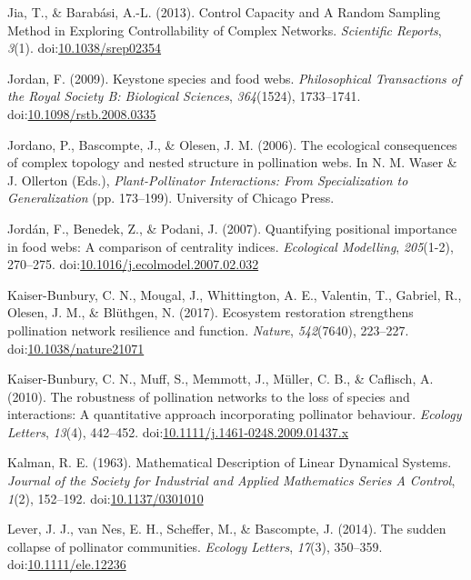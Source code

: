 \documentclass[a4paper]{artikel1}
\theoremstyle{definition}
\theoremstyle{definition}
\theoremstyle{definition}
\theoremstyle{remark}
\begin{document}
\hypertarget{ref-jia_control_2013}{}
Jia, T., \& Barabási, A.-L. (2013). Control Capacity and A Random
Sampling Method in Exploring Controllability of Complex Networks.
\emph{Scientific Reports}, \emph{3}(1).
doi:\href{https://doi.org/10.1038/srep02354}{10.1038/srep02354}

\hypertarget{ref-jordan_keystone_2009}{}
Jordan, F. (2009). Keystone species and food webs. \emph{Philosophical
Transactions of the Royal Society B: Biological Sciences},
\emph{364}(1524), 1733--1741.
doi:\href{https://doi.org/10.1098/rstb.2008.0335}{10.1098/rstb.2008.0335}

\hypertarget{ref-jordano_ecological_2006}{}
Jordano, P., Bascompte, J., \& Olesen, J. M. (2006). The ecological
consequences of complex topology and nested structure in pollination
webs. In N. M. Waser \& J. Ollerton (Eds.), \emph{Plant-Pollinator
Interactions: From Specialization to Generalization} (pp. 173--199).
University of Chicago Press.

\hypertarget{ref-jordan_quantifying_2007}{}
Jordán, F., Benedek, Z., \& Podani, J. (2007). Quantifying positional
importance in food webs: A comparison of centrality indices.
\emph{Ecological Modelling}, \emph{205}(1-2), 270--275.
doi:\href{https://doi.org/10.1016/j.ecolmodel.2007.02.032}{10.1016/j.ecolmodel.2007.02.032}

\hypertarget{ref-kaiser-bunbury_ecosystem_2017}{}
Kaiser-Bunbury, C. N., Mougal, J., Whittington, A. E., Valentin, T.,
Gabriel, R., Olesen, J. M., \& Blüthgen, N. (2017). Ecosystem
restoration strengthens pollination network resilience and function.
\emph{Nature}, \emph{542}(7640), 223--227.
doi:\href{https://doi.org/10.1038/nature21071}{10.1038/nature21071}

\hypertarget{ref-kaiser-bunbury_robustness_2010}{}
Kaiser-Bunbury, C. N., Muff, S., Memmott, J., Müller, C. B., \&
Caflisch, A. (2010). The robustness of pollination networks to the loss
of species and interactions: A quantitative approach incorporating
pollinator behaviour. \emph{Ecology Letters}, \emph{13}(4), 442--452.
doi:\href{https://doi.org/10.1111/j.1461-0248.2009.01437.x}{10.1111/j.1461-0248.2009.01437.x}

\hypertarget{ref-kalman_mathematical_1963}{}
Kalman, R. E. (1963). Mathematical Description of Linear Dynamical
Systems. \emph{Journal of the Society for Industrial and Applied
Mathematics Series A Control}, \emph{1}(2), 152--192.
doi:\href{https://doi.org/10.1137/0301010}{10.1137/0301010}

\hypertarget{ref-lever_sudden_2014}{}
Lever, J. J., van Nes, E. H., Scheffer, M., \& Bascompte, J. (2014). The
sudden collapse of pollinator communities. \emph{Ecology Letters},
\emph{17}(3), 350--359.
doi:\href{https://doi.org/10.1111/ele.12236}{10.1111/ele.12236}
\end{document}

